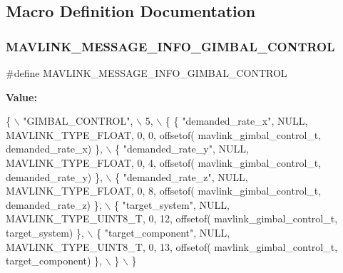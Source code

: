 \subsection{Macro Definition Documentation}
\mbox{\label{mavlink__msg__gimbal__control_8h_a322b6f8527e5c1225febe4a336238646}} 
\subsubsection{M\+A\+V\+L\+I\+N\+K\+\_\+\+M\+E\+S\+S\+A\+G\+E\+\_\+\+I\+N\+F\+O\+\_\+\+G\+I\+M\+B\+A\+L\+\_\+\+C\+O\+N\+T\+R\+OL}
{\footnotesize\ttfamily \#define M\+A\+V\+L\+I\+N\+K\+\_\+\+M\+E\+S\+S\+A\+G\+E\+\_\+\+I\+N\+F\+O\+\_\+\+G\+I\+M\+B\+A\+L\+\_\+\+C\+O\+N\+T\+R\+OL}

{\bfseries Value\+:}
\begin{DoxyCode}
\{ \(\backslash\)
    \textcolor{stringliteral}{"GIMBAL\_CONTROL"}, \(\backslash\)
    5, \(\backslash\)
    \{  \{ \textcolor{stringliteral}{"demanded\_rate\_x"}, NULL, MAVLINK_TYPE_FLOAT, 0, 0, offsetof(
      mavlink_gimbal_control_t, demanded\_rate\_x) \}, \(\backslash\)
         \{ \textcolor{stringliteral}{"demanded\_rate\_y"}, NULL, MAVLINK_TYPE_FLOAT, 0, 4, offsetof(
      mavlink_gimbal_control_t, demanded\_rate\_y) \}, \(\backslash\)
         \{ \textcolor{stringliteral}{"demanded\_rate\_z"}, NULL, MAVLINK_TYPE_FLOAT, 0, 8, offsetof(
      mavlink_gimbal_control_t, demanded\_rate\_z) \}, \(\backslash\)
         \{ \textcolor{stringliteral}{"target\_system"}, NULL, MAVLINK_TYPE_UINT8_T, 0, 12, offsetof(
      mavlink_gimbal_control_t, target\_system) \}, \(\backslash\)
         \{ \textcolor{stringliteral}{"target\_component"}, NULL, MAVLINK_TYPE_UINT8_T, 0, 13, offsetof(
      mavlink_gimbal_control_t, target\_component) \}, \(\backslash\)
         \} \(\backslash\)
\}
\end{DoxyCode}
\mbox{\label{mavlink__msg__gimbal__control_8h_a9102c9febd387eaffc1b63e93255923d}} 
